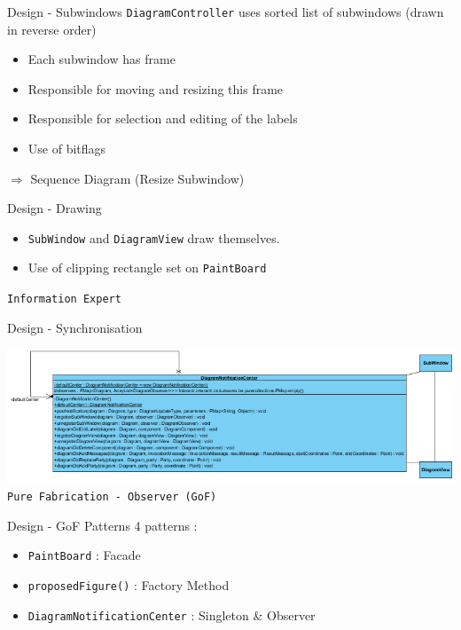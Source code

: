 \documentclass[10pt]{beamer}
\begin{document}
\begin{frame}[fragile]{Design - Subwindows}
\texttt{DiagramController} uses sorted list of subwindows (drawn in reverse order)
\begin{itemize}
\item Each subwindow has frame
\item Responsible for moving and resizing this frame
\item Responsible for selection and editing of the labels
\item Use of bitflags
\end{itemize}
$\Rightarrow$ Sequence Diagram (Resize Subwindow) 
\begin{center}
\vspace{1cm}
\end{center}
\end{frame}

\begin{frame}[fragile]{Design - Drawing}
\begin{itemize}
\item \texttt{SubWindow} and \texttt{DiagramView} draw themselves.
\item Use of clipping rectangle set on \texttt{PaintBoard}
\end{itemize}
\begin{center}
\vspace{1cm}
\texttt{Information Expert}
\end{center}
\end{frame}

\begin{frame}[fragile]{Design - Synchronisation}
\begin{center}
\includegraphics[width=1\textwidth]{notificationcenter}\\
\texttt{Pure Fabrication - Observer (GoF)}
\end{center}
\end{frame}

\begin{frame}[fragile]{Design - GoF Patterns}
4 patterns :
\begin{itemize}
\item \texttt{PaintBoard} : Facade
\item \texttt{proposedFigure()} : Factory Method
\item \texttt{DiagramNotificationCenter} : Singleton \& Observer
\end{itemize}
\end{frame}
\end{document}
